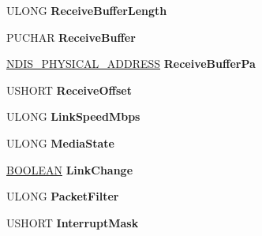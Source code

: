 \begin{DoxyCompactItemize}
\begin{tabbing}
\end{tabbing}\item 
\mbox{\label{struct___r_t_l___a_d_a_p_t_e_r_af9c31b6c4ee48baa58a7dbf128f19dfe}} 
U\+L\+O\+NG {\bfseries Receive\+Buffer\+Length}
\item 
\mbox{\label{struct___r_t_l___a_d_a_p_t_e_r_a2906ce2f788a919b7995863eb5d9fafd}} 
P\+U\+C\+H\+AR {\bfseries Receive\+Buffer}
\item 
\mbox{\label{struct___r_t_l___a_d_a_p_t_e_r_ab21596c39e0946852ca6022073519b93}} 
\hyperlink{union___l_a_r_g_e___i_n_t_e_g_e_r}{N\+D\+I\+S\+\_\+\+P\+H\+Y\+S\+I\+C\+A\+L\+\_\+\+A\+D\+D\+R\+E\+SS} {\bfseries Receive\+Buffer\+Pa}
\item 
\mbox{\label{struct___r_t_l___a_d_a_p_t_e_r_ac60d12cc36f958e749e6bf48b719e540}} 
U\+S\+H\+O\+RT {\bfseries Receive\+Offset}
\item 
\mbox{\label{struct___r_t_l___a_d_a_p_t_e_r_a989c60234e14697b0b1fb5e0209376c5}} 
U\+L\+O\+NG {\bfseries Link\+Speed\+Mbps}
\item 
\mbox{\label{struct___r_t_l___a_d_a_p_t_e_r_a50697d9f9316e3bc2d351613ab78242d}} 
U\+L\+O\+NG {\bfseries Media\+State}
\item 
\mbox{\label{struct___r_t_l___a_d_a_p_t_e_r_a1212b9c93a89208e5b2c50f5de9b91d0}} 
\hyperlink{_processor_bind_8h_a112e3146cb38b6ee95e64d85842e380a}{B\+O\+O\+L\+E\+AN} {\bfseries Link\+Change}
\item 
\mbox{\label{struct___r_t_l___a_d_a_p_t_e_r_a7c9e67194e67fd8697819e2d171d9846}} 
U\+L\+O\+NG {\bfseries Packet\+Filter}
\item 
\mbox{\label{struct___r_t_l___a_d_a_p_t_e_r_af9fd8156cb875a046408691fd7b98892}} 
U\+S\+H\+O\+RT {\bfseries Interrupt\+Mask}
\item 
\mbox{\label{struct___r_t_l___a_d_a_p_t_e_r_a6827ae6476772105788871a91e572261}} 

\end{DoxyCompactItemize}
